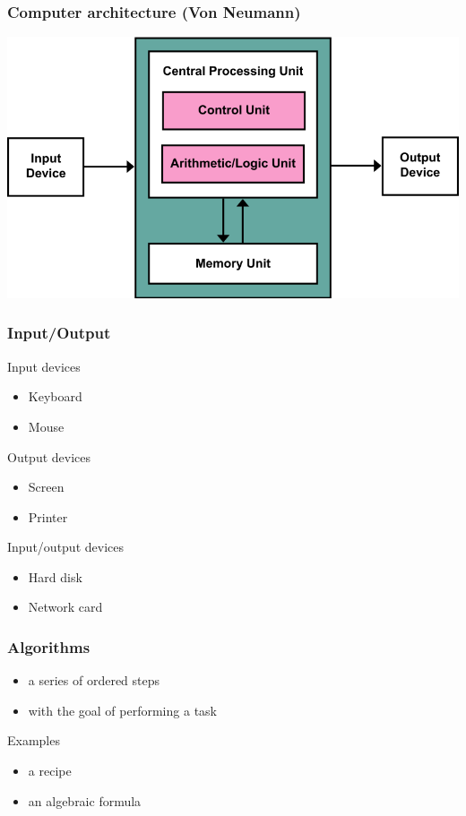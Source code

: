 \documentclass[pdftex, 11pt]{beamer}
\begin{document}
\begin{frame}
  \frametitle{Computer architecture (Von Neumann)}
  \includegraphics[width=\textwidth]{img/vonNeumannArchitecture.png}
\end{frame}

\begin{frame}
  \frametitle{Input/Output}
  \begin{block}{Input devices}
    \begin{itemize}
    \item Keyboard
    \item Mouse
    \end{itemize}
  \end{block}
  \pause
  \begin{block}{Output devices}
    \begin{itemize}
    \item Screen
    \item Printer
    \end{itemize}
  \end{block}
  \pause
  \begin{block}{Input/output devices}
    \begin{itemize}
    \item Hard disk
    \item Network card
    \end{itemize}
  \end{block}
\end{frame}

\begin{frame}
  \frametitle{Algorithms}
  \begin{itemize}
  \item a series of ordered \alert{steps}
  \item with the goal of performing a \alert{task}
  \end{itemize}
  \pause
  \begin{block}{Examples}
    \begin{itemize}
    \item a recipe
    \item an algebraic formula
    \end{itemize}
  \end{block}
\end{frame}
\end{document}
